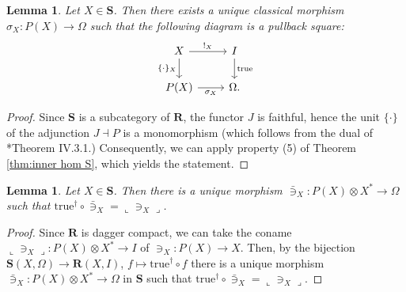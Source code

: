 \documentclass[12pt]{tac}
\newtheorem{lemma}[theorem]{Lemma}
\theoremstyle{definition}
\theoremstyle{remark}
\newcommand{\<}{\langle}
\renewcommand{\>}{\rangle}
\renewcommand{\:}{\colon}
\newcommand{\coname}[1]{\llcorner #1\lrcorner}
\begin{document}
\begin{lemma}
    Let $X\in\mathbf S$. Then there exists a unique classical morphism $\sigma_X:P(X)\to\Omega$ such that
the following diagram is a pullback square:
       \[\begin{tikzcd}
X\ar{r}{!_X}\ar{d}[swap]{\{\cdot\}_X} & I\ar{d}{\mathrm{true}}\\
P(X)\ar{r}[swap]{\sigma_X} & \Omega.
\end{tikzcd}\]
\end{lemma}
\begin{proof}
   Since $\mathbf S$ is a subcategory of $\mathbf R$, the functor $J$ is faithful, hence the unit $\{\cdot\}$ of the adjunction $J\dashv P$ is a monomorphism (which follows from the dual of \cite{maclane}*{Theorem IV.3.1}.) Consequently, we can apply property (5) of Theorem \ref{thm:inner hom S}, which yields the statement.
\end{proof}


\begin{lemma}\label{lem:bar ni}
    Let $X\in\mathbf S$. Then there is a unique morphism $\bar\ni_X:P(X)\otimes X^*\to\Omega$ such that $\mathrm{true}^\dag\circ\bar\ni_X=\coname{\ni_X}$. 
\end{lemma}
\begin{proof}
Since $\mathbf R$ is dagger compact, we can take the coname $\coname{\ni_X}:P(X)\otimes X^*\to I$ of $\ni_X:P(X)\to X$. Then, by the bijection $\mathbf S(X,\Omega)\to \mathbf R(X,I)$, $f\mapsto \mathrm{true}^\dag\circ f$ there is a unique morphism $\bar\ni_X:P(X)\otimes X^*\to\Omega$ in $\mathbf S$ such that $\mathrm{true}^\dag\circ\bar\ni_X=\coname{\ni_X}$.    
\end{proof}
\end{document}
